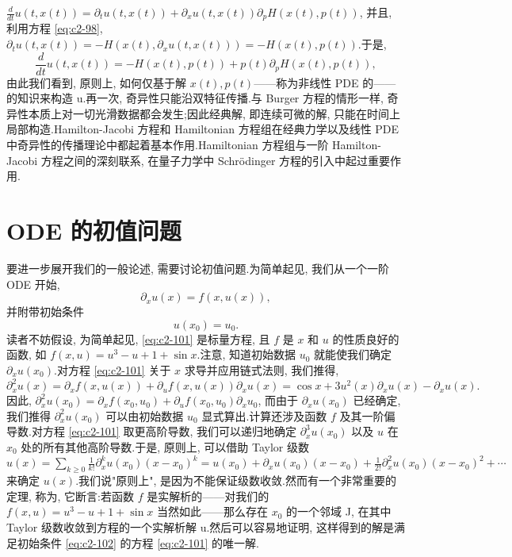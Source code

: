 $\frac{d}{d t} u(t, x(t)) = \partial_{t} u(t, x(t)) + \partial_{x} u(t, x(t)) \partial_{p} H(x(t), p(t))$,
并且, 利用方程 \eqref{eq:c2-98}, $\partial_{t} u(t, x(t)) = -H(x(t), \partial_{x} u(t, x(t))) = -H(x(t), p(t))$.于是,
\[
\frac{d}{d t} u(t, x(t)) = -H(x(t), p(t)) + p(t) \partial_{p} H(x(t), p(t)),
\]
由此我们看到, 原则上, 如何仅基于解 $x(t), p(t)$——称为非线性 PDE 的——的知识来构造 u.再一次, 奇异性只能沿双特征传播.与 Burger 方程的情形一样, 奇异性本质上对一切光滑数据都会发生;因此经典解, 即连续可微的解, 只能在时间上局部构造.Hamilton-Jacobi 方程和 Hamiltonian 方程组在经典力学以及线性 PDE 中奇异性的传播理论中都起着基本作用.Hamiltonian 方程组与一阶 Hamilton-Jacobi 方程之间的深刻联系, 在量子力学中 Schrödinger 方程的引入中起过重要作用.

\section{ODE 的初值问题}

要进一步展开我们的一般论述, 需要讨论初值问题.为简单起见, 我们从一个一阶 ODE 开始,
\begin{equation}
\partial_{x} u(x) = f(x, u(x)), \label{eq:c2-101}
\end{equation}
并附带初始条件
\begin{equation}
u(x_{0}) = u_{0}. \label{eq:c2-102}
\end{equation}
读者不妨假设, 为简单起见, \eqref{eq:c2-101} 是标量方程, 且 $f$ 是 $x$ 和 $u$ 的性质良好的函数, 如 $f(x, u) = u^{3} - u + 1 + \sin x$.注意, 知道初始数据 $u_{0}$ 就能使我们确定 $\partial_{x} u(x_{0})$.对方程 \eqref{eq:c2-101} 关于 $x$ 求导并应用链式法则, 我们推得,
\[
\partial_{x}^{2} u(x) = \partial_{x} f(x, u(x)) + \partial_{u} f(x, u(x)) \partial_{x} u(x) = \cos x + 3 u^{2}(x) \partial_{x} u(x) - \partial_{x} u(x).
\]
因此, $\partial_{x}^{2} u(x_{0}) = \partial_{x} f(x_{0}, u_{0}) + \partial_{u} f(x_{0}, u_{0}) \partial_{x} u_{0}$, 而由于 $\partial_{x} u(x_{0})$ 已经确定, 我们推得 $\partial_{x}^{2} u(x_{0})$ 可以由初始数据 $u_{0}$ 显式算出.计算还涉及函数 $f$ 及其一阶偏导数.对方程 \eqref{eq:c2-101} 取更高阶导数, 我们可以递归地确定 $\partial_{x}^{3} u(x_{0})$ 以及 $u$ 在 $x_{0}$ 处的所有其他高阶导数.于是, 原则上, 可以借助 Taylor 级数
$u(x) = \sum_{k \geq 0} \frac{1}{k!} \partial_{x}^{k} u(x_{0}) (x - x_{0})^{k} = u(x_{0}) + \partial_{x} u(x_{0}) (x - x_{0}) + \frac{1}{2!} \partial_{x}^{2} u(x_{0}) (x - x_{0})^{2} + \cdots$
来确定 $u(x)$.我们说"原则上", 是因为不能保证级数收敛.然而有一个非常重要的定理, 称为, 它断言:若函数 $f$ 是实解析的——对我们的 $f(x, u) = u^{3} - u + 1 + \sin x$ 当然如此——那么存在 $x_{0}$ 的一个邻域 J, 在其中 Taylor 级数收敛到方程的一个实解析解 u.然后可以容易地证明, 这样得到的解是满足初始条件 \eqref{eq:c2-102} 的方程 \eqref{eq:c2-101} 的唯一解.

